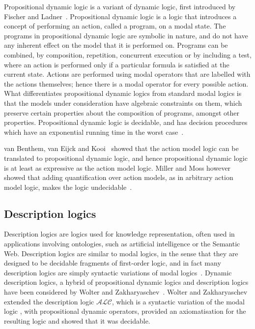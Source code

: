 Propositional dynamic logic is a variant of dynamic logic, first introduced by
Fischer and Ladner~\cite{fischer1979propositional}. Propositional dynamic logic
is a logic that introduces a concept of performing an action, called a program,
on a modal state. The programs in propositional dynamic logic are symbolic in
nature, and do not have any inherent effect on the model that it is performed
on. Programs can be combined, by composition, repetition, concurrent execution
or by including a test, where an action is performed only if a particular
formula is satisfied at the current state. Actions are performed using modal
operators that are labelled with the actions themselves; hence there is a modal
operator for every possible action. What differentiates propositional dynamic
logics from standard modal logics is that the models under consideration have
algebraic constraints on them, which preserve certain properties about the
composition of programs, amongst other properties. Propositional dynamic logic
is decidable, and has decision procedures which have an exponential running time
in the worst case~\cite{pratt1980near}.

van Benthem, van Eijck and Kooi~\cite{vanbenthem2006logics} showed that the
action model logic can be translated to propositional dynamic logic, and hence
propositional dynamic logic is at least as expressive as the action model logic.
Miller and Moss however showed that adding quantification over action models,
as in arbitrary action model logic, makes the logic
undecidable~\cite{miller2005undecidability}.

\subsection{Description logics}

Description logics are logics used for knowledge representation, often used in
applications involving ontologies, such as artificial intelligence or the
Semantic Web. Description logics are similar to modal logics, in the sense that
they are designed to be decidable fragments of first-order logic, and in fact
many description logics are simply syntactic variations of modal
logics~\cite{blackburn2002modal}. Dynamic description logics, a hybrid of
propositional dynamic logics and description logics have been considered by
Wolter and Zakharyaschev~\cite{wolter1998dynamic}. Wolter and Zakharyaschev
extended the description logic $\mathcal{ALC}$, which is a syntactic variation of
the modal logic \logicK{}, with propositional dynamic operators, provided an
axiomatisation for the resulting logic and showed that it was decidable.

